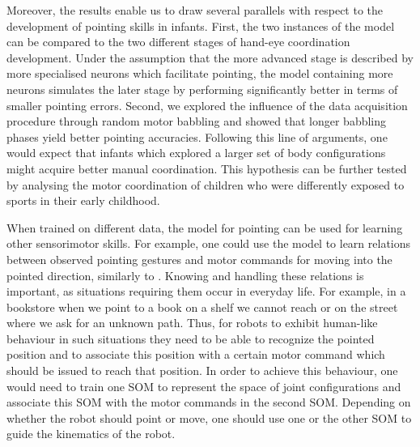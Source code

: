 Moreover, the results enable us to draw several parallels with respect to the development of pointing skills in infants. First, the two instances of the model can be compared to the two different stages of hand-eye coordination development. Under the assumption that the more advanced stage is described by more specialised neurons which facilitate pointing, the model containing more neurons simulates the later stage by performing significantly better in terms of smaller pointing errors. Second, we explored the influence of the data acquisition procedure through random motor babbling and showed that longer babbling phases yield better pointing accuracies. Following this line of arguments, one would expect that infants which explored a larger set of body configurations might acquire better manual coordination. This hypothesis can be further tested by analysing the motor coordination of children who were differently exposed to sports in their early childhood. 

When trained on different data, the model for pointing can be used for learning 
other sensorimotor skills. For example, one could use the model to learn 
relations between observed pointing gestures and motor commands for moving into 
the pointed direction, similarly to \citep{Bodiroza2013}. Knowing and handling 
these relations is important, as situations requiring them occur in everyday 
life. For example, in a bookstore when we point to a book on a shelf we cannot 
reach or on the street where we ask for an unknown path. Thus, for robots to 
exhibit human-like behaviour in such situations they need to be able to 
recognize the pointed position and to associate this position with a certain 
motor command which should be issued to reach that position. In order to achieve 
this behaviour, one would need to train one SOM to represent the space of joint 
configurations and associate this SOM with the motor commands in the second SOM. 
Depending on whether the robot should point or move, one should use one or the 
other 
SOM to guide the kinematics of the robot.


